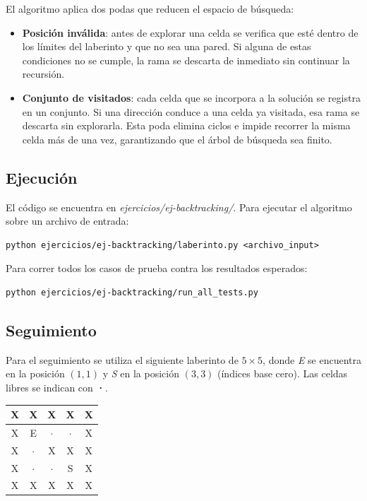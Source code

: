El algoritmo aplica dos podas que reducen el espacio de búsqueda:

\begin{itemize}
    \item \textbf{Posición inválida}: antes de explorar una celda se verifica que esté dentro de los límites del laberinto y que no sea una pared. Si alguna de estas condiciones no se cumple, la rama se descarta de inmediato sin continuar la recursión.
    \item \textbf{Conjunto de visitados}: cada celda que se incorpora a la solución se registra en un conjunto. Si una dirección conduce a una celda ya visitada, esa rama se descarta sin explorarla. Esta poda elimina ciclos e impide recorrer la misma celda más de una vez, garantizando que el árbol de búsqueda sea finito.
\end{itemize}

\subsection{Ejecución}

El código se encuentra en \textit{ejercicios/ej-backtracking/}. Para ejecutar el algoritmo sobre un archivo de entrada:

\begin{verbatim}
python ejercicios/ej-backtracking/laberinto.py <archivo_input>
\end{verbatim}

Para correr todos los casos de prueba contra los resultados esperados:

\begin{verbatim}
python ejercicios/ej-backtracking/run_all_tests.py
\end{verbatim}

\subsection{Seguimiento}

Para el seguimiento se utiliza el siguiente laberinto de $5 \times 5$, donde \textit{E} se encuentra en la posición $(1,1)$ y \textit{S} en la posición $(3,3)$ (índices base cero). Las celdas libres se indican con \textbf{·}.

\begin{center}
\begin{tabular}{|c|c|c|c|c|}
\hline
X & X & X & X & X \\
\hline
X & E & $\cdot$ & $\cdot$ & X \\
\hline
X & $\cdot$ & X & X & X \\
\hline
X & $\cdot$ & $\cdot$ & S & X \\
\hline
X & X & X & X & X \\
\hline
\end{tabular}
\end{center}

